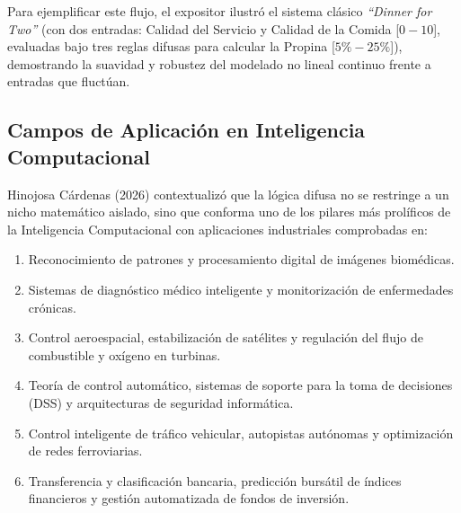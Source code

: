 \documentclass[12pt,a4paper]{article}
\begin{document}
Para ejemplificar este flujo, el expositor ilustró el sistema clásico \textit{``Dinner for Two''} (con dos entradas: Calidad del Servicio y Calidad de la Comida [$0-10$], evaluadas bajo tres reglas difusas para calcular la Propina [$5\%-25\%$]), demostrando la suavidad y robustez del modelado no lineal continuo frente a entradas que fluctúan.

\subsection*{Campos de Aplicación en Inteligencia Computacional}
Hinojosa Cárdenas (2026) contextualizó que la lógica difusa no se restringe a un nicho matemático aislado, sino que conforma uno de los pilares más prolíficos de la Inteligencia Computacional con aplicaciones industriales comprobadas en:
\begin{enumerate}
    \item Reconocimiento de patrones y procesamiento digital de imágenes biomédicas.
    \item Sistemas de diagnóstico médico inteligente y monitorización de enfermedades crónicas.
    \item Control aeroespacial, estabilización de satélites y regulación del flujo de combustible y oxígeno en turbinas.
    \item Teoría de control automático, sistemas de soporte para la toma de decisiones (DSS) y arquitecturas de seguridad informática.
    \item Control inteligente de tráfico vehicular, autopistas autónomas y optimización de redes ferroviarias.
    \item Transferencia y clasificación bancaria, predicción bursátil de índices financieros y gestión automatizada de fondos de inversión.
\end{enumerate}
\end{document}
